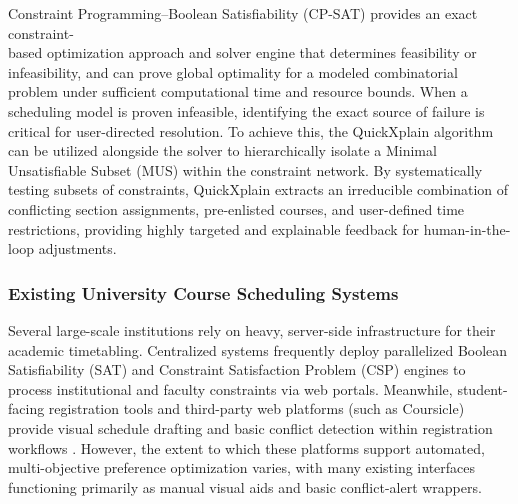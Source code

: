 \documentclass{icsthesis}
\begin{document}
\begin{mainmatter}
		Constraint Programming--Boolean Satisfiability (CP-SAT) provides an exact constraint-\\based optimization approach and solver engine that determines feasibility or infeasibility, and can prove global optimality for a modeled combinatorial problem under sufficient computational time and resource bounds. When a scheduling model is proven infeasible, identifying the exact source of failure is critical for user-directed resolution. To achieve this, the QuickXplain algorithm \citep{junker2004} can be utilized alongside the solver to hierarchically isolate a Minimal Unsatisfiable Subset (MUS) within the constraint network. By systematically testing subsets of constraints, QuickXplain extracts an irreducible combination of conflicting section assignments, pre-enlisted courses, and user-defined time restrictions, providing highly targeted and explainable feedback for human-in-the-loop adjustments.
		
		\subsubsection{Existing University Course Scheduling Systems}
		Several large-scale institutions rely on heavy, server-side infrastructure for their academic timetabling. Centralized systems frequently deploy parallelized Boolean Satisfiability (SAT) and Constraint Satisfaction Problem (CSP) engines to process institutional and faculty constraints via web portals. Meanwhile, student-facing registration tools and third-party web platforms (such as Coursicle) provide visual schedule drafting and basic conflict detection within registration workflows \citep{coursicle}. However, the extent to which these platforms support automated, multi-objective preference optimization varies, with many existing interfaces functioning primarily as manual visual aids and basic conflict-alert wrappers.
		

\end{mainmatter}
\end{document}
